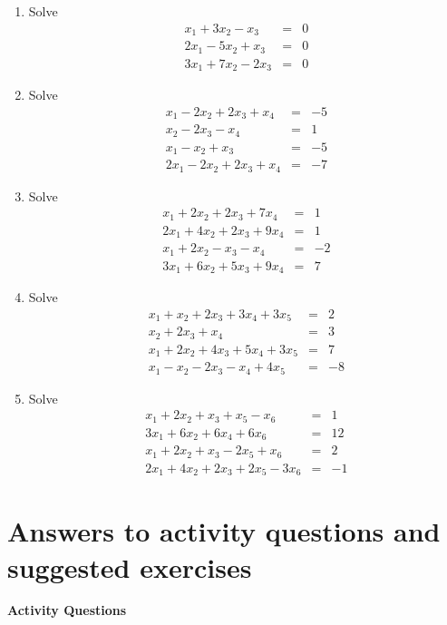 \begin{enumerate}
\item Solve
\begin{eqnarray*} x_1+3x_2-x_3&=&0\\
2x_1-5x_2+x_3&=&0\\ 3x_1+7x_2-2x_3&=&0 \end{eqnarray*}

\item Solve
$$\begin{array}{rrr} x_1-2x_2+2x_3+x_4&=&-5\\
x_2-2x_3-x_4&=&1\\ x_1-x_2+x_3&=&-5\\ 2x_1-2x_2+2x_3+x_4&=&-7
\end{array}$$

\item Solve
$$\begin{array}{rrr} x_1+2x_2+2x_3+7x_4&=&1\\
2x_1+4x_2+2x_3+9x_4&=&1\\ x_1+2x_2-x_3-x_4&=&-2\\ 3x_1+6x_2+5x_3+9x_4&=&7
\end{array}$$

\item Solve
$$\begin{array}{rrr} x_1+x_2+2x_3+3x_4+3x_5&=&2\\
x_2+2x_3+x_4&=&3\\ x_1+2x_2+4x_3+5x_4+3x_5&=&7\\ x_1-x_2-2x_3-x_4+4x_5&=&-8
\end{array}$$

\item Solve
$$\begin{array}{rrr} x_1+2x_2+x_3+x_5-x_6&=&1\\
3x_1+6x_2+6x_4+6x_6&=&12\\ x_1+2x_2+x_3-2x_5+x_6&=&2\\ 2x_1+4x_2+2x_3+2x_5-3x_6&=&-1
\end{array}$$
\end{enumerate}



\section{Answers to activity questions and suggested
exercises}\label{ssec.answers1}

{\bf Activity Questions}

\bigskip

